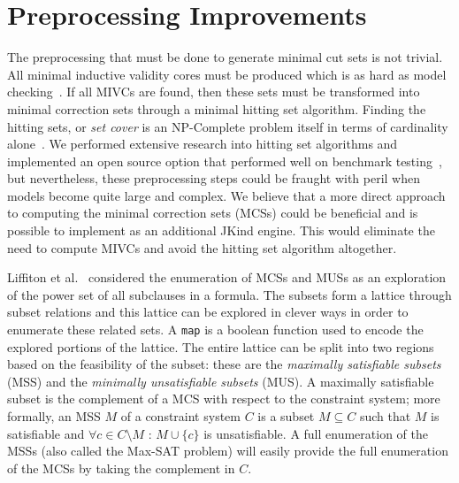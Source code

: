 \section{Preprocessing Improvements}
The preprocessing that must be done to generate minimal cut sets is not trivial. All minimal inductive validity cores must be produced which is as hard as model checking~\cite{GhassabaniGW16}. If all MIVCs are found, then these sets must be transformed into minimal correction sets through a minimal hitting set algorithm. Finding the hitting sets, or {\em set cover} is an NP-Complete problem itself in terms of cardinality alone~\cite{gainer2017minimal,murakami2013efficient}.%
We performed extensive research into hitting set algorithms and implemented an open source option that performed well on benchmark testing~\cite{}, but nevertheless, these preprocessing steps could be fraught with peril when models become quite large and complex. We believe that a more direct approach to computing the minimal correction sets (MCSs) could be beneficial and is possible to implement as an additional JKind engine. This would eliminate the need to compute MIVCs and avoid the hitting set algorithm altogether. 

Liffiton et al.~\cite{liffiton2016fast} considered the enumeration of MCSs and MUSs as an exploration of the power set of all subclauses in a formula. The subsets form a lattice through subset relations and this lattice can be explored in clever ways in order to enumerate these related sets. A \texttt{map} is a boolean function used to encode the explored portions of the lattice. The entire lattice can be split into two regions based on the feasibility of the subset: these are the {\em maximally satisfiable subsets} (MSS) and the {\em minimally unsatisfiable subsets} (MUS). A maximally satisfiable subset is the complement of a MCS with respect to the constraint system; more formally, an MSS $M$ of a constraint system $C$ is a subset $M\subseteq C$ such that $M$ is satisfiable and $\forall c \in C \setminus M$ : $M \cup \{c\}$ is unsatisfiable. A full enumeration of the MSSs (also called the Max-SAT problem) will easily provide the full enumeration of the MCSs by taking the complement in $C$. 

